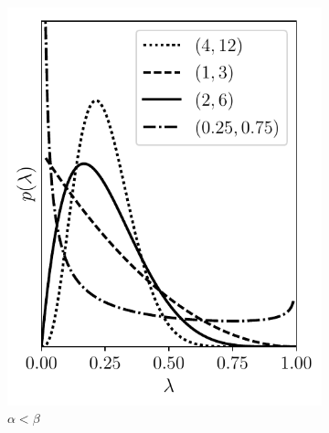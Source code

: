 \begin{figure}[t]
\begin{subfigure}{0.325\textwidth}
\includegraphics[width=0.99\linewidth]{Chapters/02_LinearAlgebra/30_prob/python/beta2.pdf}
\caption{$\alpha < \beta$}
\label{fig:30_3b}
\end{subfigure}
\begin{subfigure}{0.325\textwidth}

\end{subfigure}
\end{figure}
